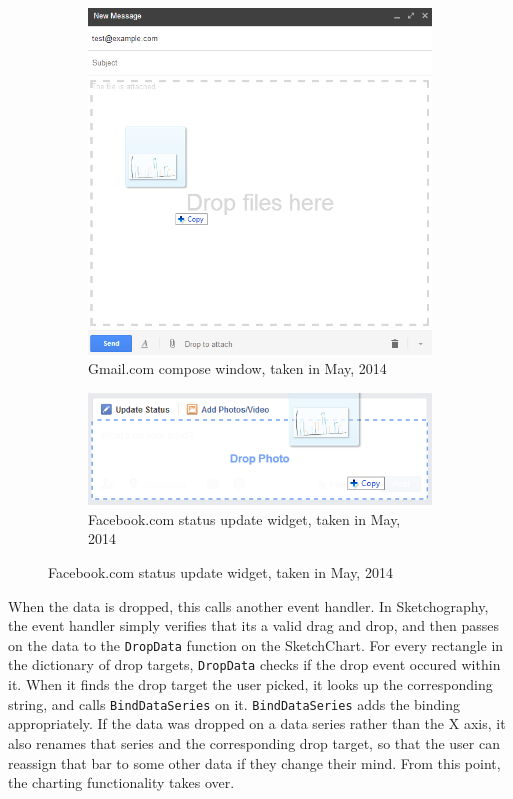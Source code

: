 		\begin{figure}[H]
		\centering
		\begin{subfigure}[b]{0.4\textwidth}
			\includegraphics[width=\textwidth]{dropexample1}
			\caption{Gmail.com compose window, taken in May, 2014}
			\label{fig:dropexample1}
		\end{subfigure}
		\begin{subfigure}[b]{0.4\textwidth}
			\includegraphics[width=\textwidth]{dropexample2}
			\caption{Facebook.com status update widget, taken in May, 2014}
			\label{fig:dropexample2}
		\end{subfigure}

	\end{figure}	

	
	When the data is dropped, this calls another event handler. In Sketchography, the event handler simply verifies that its a valid drag and drop, and then passes on the data to the \texttt{DropData} function on the SketchChart. For every rectangle in the dictionary of drop targets, \texttt{DropData} checks if the drop event occured within it. When it finds the drop target the user picked, it looks up the corresponding string, and calls \texttt{BindDataSeries} on it. \texttt{BindDataSeries} adds the binding appropriately. If the data was dropped on a data series rather than the X axis, it also renames that series and the corresponding drop target, so that the user can reassign that bar to some other data if they change their mind. From this point, the charting functionality takes over.
	
